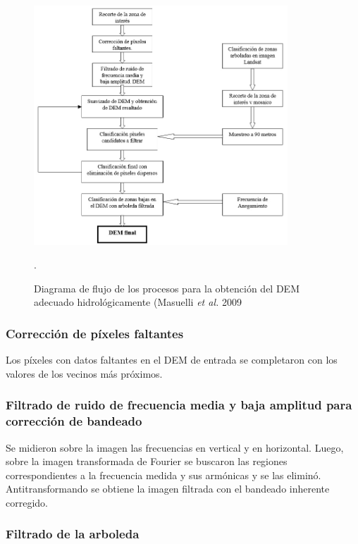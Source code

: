 \documentclass[10pt,a4paper, twoside]{report}
\begin{document}
\begin{figure}[!htb]
   \centering      
   \includegraphics[width=0.85\textwidth]{imagenes/metodologiaSergio.jpg}
 \caption{Diagrama de flujo de los procesos para la obtención del DEM adecuado hidrológicamente (Masuelli \textit{et al.} 2009}.
 \label{metodologiaSergio}
\end{figure}

\subsubsection{Corrección de píxeles faltantes}

Los píxeles con datos faltantes en el DEM de entrada se completaron con los valores de los vecinos más próximos.

\subsubsection{Filtrado de ruido de frecuencia media y baja amplitud para corrección de bandeado}
\label{filtroBandeadoSergio}

Se midieron sobre la imagen las frecuencias en vertical y en horizontal. Luego, sobre la imagen transformada de Fourier se buscaron las regiones correspondientes a la frecuencia medida y sus armónicas y se las eliminó. Antitransformando se obtiene la imagen filtrada con el bandeado inherente corregido.

\subsubsection{Filtrado de la arboleda}
\label{filtroArbolSergio}
\end{document}
